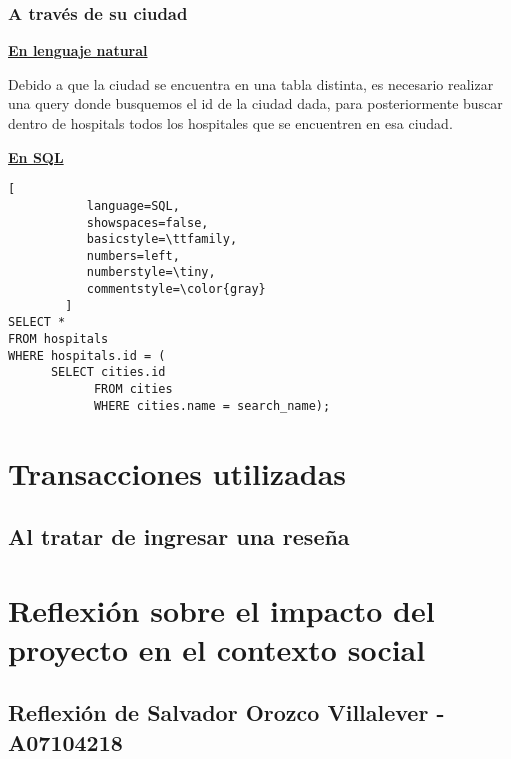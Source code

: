 \subsubsection{A través de su ciudad}

\textbf{\underline{En lenguaje natural}}

\vspace{0.3 cm}

Debido a que la ciudad se encuentra en una tabla distinta, es necesario realizar una query donde busquemos el id de la ciudad dada, para posteriormente buscar dentro de hospitals todos los hospitales que se encuentren en esa ciudad.

\vspace{0.3 cm}

\textbf{\underline{En SQL}}

\vspace{0.3 cm}

\begin{lstlisting}[
           language=SQL,
           showspaces=false,
           basicstyle=\ttfamily,
           numbers=left,
           numberstyle=\tiny,
           commentstyle=\color{gray}
        ]
SELECT * 
FROM hospitals 
WHERE hospitals.id = (
      SELECT cities.id
            FROM cities
            WHERE cities.name = search_name);
\end{lstlisting}

\section{Transacciones utilizadas}

\subsection{Al tratar de ingresar una reseña}

\section{Reflexión sobre el impacto del proyecto en el contexto social}

\subsection{Reflexión de Salvador Orozco Villalever - A07104218}

